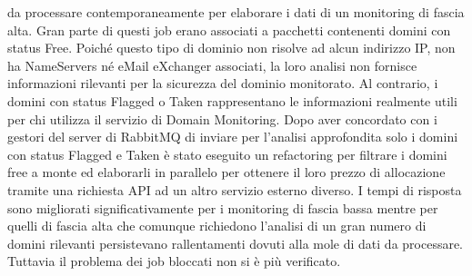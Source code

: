 \documentclass[target=bach,aauheader=,style=]{thud}
\begin{document}
da processare contemporaneamente per elaborare i dati di un monitoring di fascia alta. Gran parte di questi job erano associati a pacchetti contenenti domini con status Free. Poiché questo tipo di dominio non risolve
ad alcun indirizzo IP, non ha NameServers né eMail eXchanger associati, la loro analisi non fornisce informazioni rilevanti per la sicurezza del dominio monitorato. Al contrario, i domini con status Flagged o Taken rappresentano le informazioni realmente
utili per chi utilizza il servizio di Domain Monitoring. Dopo aver concordato con i gestori del server di RabbitMQ di inviare per l'analisi approfondita solo i domini con status Flagged e Taken
è stato eseguito un refactoring per filtrare i domini free a monte ed elaborarli in parallelo per ottenere il loro prezzo di allocazione tramite una richiesta API ad un altro
servizio esterno diverso. I tempi di risposta sono migliorati significativamente per i monitoring di fascia bassa mentre per quelli di fascia alta che comunque richiedono l'analisi di un
gran numero di domini rilevanti persistevano rallentamenti dovuti alla mole di dati da processare. Tuttavia il problema dei job bloccati non si è più verificato.
\end{document}
